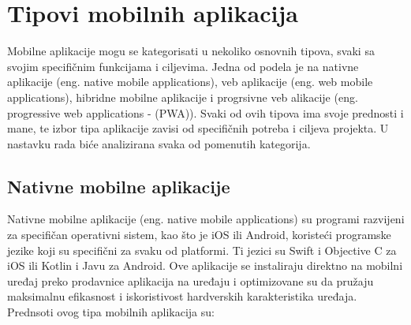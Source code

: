 \documentclass[12pt,oneside]{memoir}
\begin{document}
\section{Tipovi mobilnih aplikacija}

Mobilne aplikacije mogu se kategorisati u nekoliko osnovnih tipova, svaki sa svojim specifičnim funkcijama i ciljevima. Jedna od podela je na nativne aplikacije (eng. native mobile applications), veb aplikacije (eng. web mobile applications), hibridne mobilne aplikacije i progrsivne veb alikacije (eng. progressive web applications - (PWA)). Svaki od ovih tipova ima svoje prednosti i mane, te izbor tipa aplikacije zavisi od specifičnih potreba i ciljeva projekta. U nastavku rada biće analizirana svaka od pomenutih kategorija.

\subsection{Nativne mobilne aplikacije}

Nativne mobilne aplikacije\cite{nativeMobileApps} (eng. native mobile applications) su programi razvijeni za specifičan operativni sistem, kao što je iOS\cite{iosDocs} ili Android\cite{androidDocs}, koristeći programske jezike koji su specifični za svaku od platformi. Ti jezici su Swift i Objective C za iOS ili Kotlin i Javu za Android. Ove aplikacije se instaliraju direktno na mobilni uređaj preko prodavnice aplikacija na uređaju i optimizovane su da pružaju maksimalnu efikasnost i iskoristivost hardverskih karakteristika uređaja. Prednsoti ovog tipa mobilnih aplikacija su:
\end{document}

